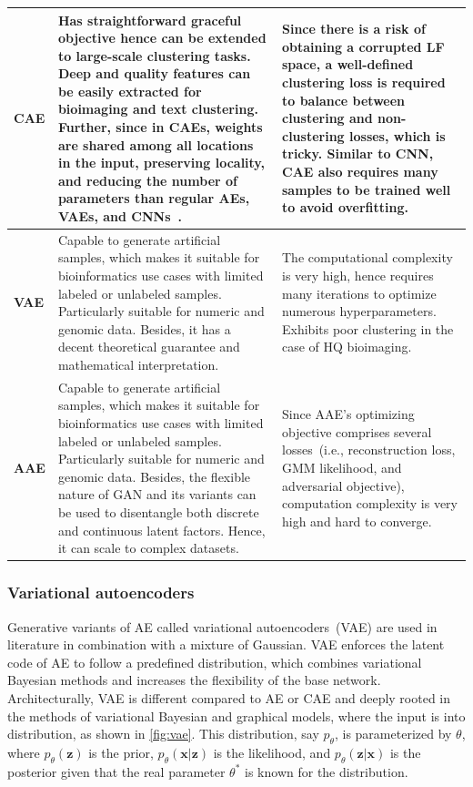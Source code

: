 \begin{table}
\begin{tabular}{p{3.5cm}|p{10.3cm}|p{10cm}}
    \textbf{CAE} & Has straightforward graceful objective hence can be extended to large-scale clustering tasks. Deep and quality features can be easily extracted for bioimaging and text clustering. Further, since in CAEs, weights are shared among all locations in the input, preserving locality, and reducing the number of parameters than regular AEs, VAEs, and CNNs~\cite{lintas2017artificial}. & Since there is a risk of obtaining a corrupted LF space, a well-defined clustering loss is required to balance between clustering and non-clustering losses, which is tricky. Similar to CNN, CAE also requires many samples to be trained well to avoid overfitting.\\\hline
    \textbf{VAE} & Capable to generate artificial samples, which makes it suitable for bioinformatics use cases with limited labeled or unlabeled samples. Particularly suitable for numeric and genomic data. Besides, it has a decent theoretical guarantee and mathematical interpretation. & The computational complexity is very high, hence requires many iterations to optimize numerous hyperparameters. Exhibits poor clustering in the case of HQ bioimaging. \\\hline
    \textbf{AAE} & Capable to generate artificial samples, which makes it suitable for bioinformatics use cases with limited labeled or unlabeled samples. Particularly suitable for numeric and genomic data. Besides, the flexible nature of GAN and its variants can be used to disentangle both discrete and continuous latent factors. Hence, it can scale to complex datasets. & Since AAE's optimizing objective comprises several losses~(i.e., reconstruction loss, GMM likelihood, and adversarial objective), computation complexity is very high and hard to converge. \\\hline
   \end{tabular}
\end{table}

\subsubsection{Variational autoencoders} 
Generative variants of AE called variational autoencoders~(VAE) are used in literature in combination with a mixture of Gaussian. VAE enforces the latent code of AE to follow a predefined distribution, which combines variational Bayesian methods and increases the flexibility of the base network. Architecturally, VAE is different compared to AE or CAE and deeply rooted in the methods of variational Bayesian and graphical models, where the input is into distribution, as shown in \cref{fig:vae}. This distribution, say $p_{\theta}$, is parameterized by $\theta$, where $p_{\theta}(\mathbf{z})$ is the prior, $p_{\theta}(\mathbf{x} | \mathbf{z})$ is the likelihood, and $p_{\theta}(\mathbf{z}|\mathbf{x})$ is the posterior given that the real parameter $\theta^*$ is known for the distribution. 

